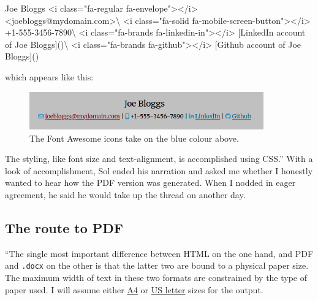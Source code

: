 \documentclass[
  british,
  a4paper,
  rgb,
  dvipsnames,
  svgnames,
  hyphens]{article}
\newenvironment{Shaded}{\begin{snugshade}}{\end{snugshade}}
\newcommand{\ErrorTok}[1]{\textcolor[rgb]{0.76,0.75,0.62}{#1}}
\newcommand{\KeywordTok}[1]{\textcolor[rgb]{0.94,0.87,0.69}{#1}}
\newcommand{\NormalTok}[1]{\textcolor[rgb]{0.80,0.80,0.80}{#1}}
\newcommand{\OtherTok}[1]{\textcolor[rgb]{0.94,0.94,0.56}{#1}}
\newcommand{\StringTok}[1]{\textcolor[rgb]{0.80,0.58,0.58}{#1}}
\begin{document}
\begin{Shaded}
\begin{Highlighting}[]
\NormalTok{Joe Bloggs}
\KeywordTok{\textless{}i} \ErrorTok{class}\OtherTok{=}\StringTok{"fa{-}regular fa{-}envelope"}\KeywordTok{\textgreater{}\textless{}/i\textgreater{}} \KeywordTok{\textless{}joebloggs}\ErrorTok{@mydomain.com}\KeywordTok{\textgreater{}}\NormalTok{\textbackslash{}}
\KeywordTok{\textless{}i} \ErrorTok{class}\OtherTok{=}\StringTok{"fa{-}solid fa{-}mobile{-}screen{-}button"}\KeywordTok{\textgreater{}\textless{}/i\textgreater{}}\NormalTok{ +1{-}555{-}3456{-}7890\textbackslash{}}
\KeywordTok{\textless{}i} \ErrorTok{class}\OtherTok{=}\StringTok{"fa{-}brands fa{-}linkedin{-}in"}\KeywordTok{\textgreater{}\textless{}/i\textgreater{}}\NormalTok{ [LinkedIn account of Joe Bloggs]()\textbackslash{}}
\KeywordTok{\textless{}i} \ErrorTok{class}\OtherTok{=}\StringTok{"fa{-}brands fa{-}github"}\KeywordTok{\textgreater{}\textless{}/i\textgreater{}}\NormalTok{ [Github account of Joe Bloggs]()}
\end{Highlighting}
\end{Shaded}

which appears like this:

\begin{figure}
\centering
\includegraphics[width=0.9\textwidth,height=\textheight]{images/opening-html.png}
\caption{The Font Awesome icons take on the blue colour above.}
\end{figure}

The styling, like font size and text-alignment, is accomplished using
CSS.'' With a look of accomplishment, Sol ended his narration and asked
me whether I honestly wanted to hear how the PDF version was generated.
When I nodded in eager agreement, he said he would take up the thread on
another day.

\hypertarget{the-route-to-pdf}{%
\subsection{The route to PDF}\label{the-route-to-pdf}}

``The single most important difference between HTML on the one hand, and
PDF and \texttt{.docx} on the other is that the latter two are bound to
a physical paper size. The maximum width of text in these two formats
are constrained by the type of paper used. I will assume either
\href{https://en.wikipedia.org/wiki/ISO_216\#A_series}{A4} or
\href{https://en.wikipedia.org/wiki/Letter_(paper_size)}{US letter}
sizes for the output.
\end{document}
